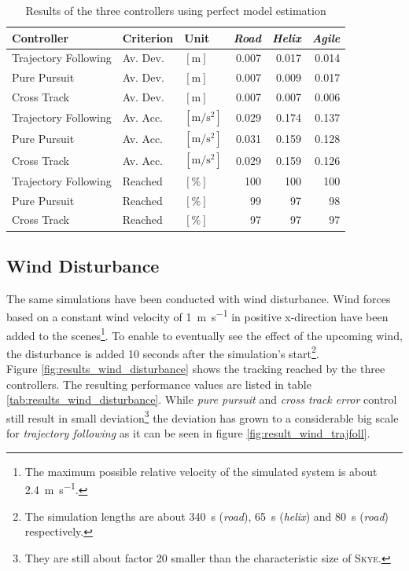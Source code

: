 \begin{table}[h]
\begin{center}
 \begin{tabular}{lll|rrr}
 \hline
 Controller & Criterion & Unit & \textit{Road} & \textit{Helix} & \textit{Agile} \\ \hline \hline
 Trajectory Following & Av. Dev. & $[\si{\meter}]$ & 0.007 & 0.017 & 0.014 \\
 Pure Pursuit         & Av. Dev. & $[\si{\meter}]$ & 0.007 & 0.009 & 0.017 \\
 Cross Track          & Av. Dev. & $[\si{\meter}]$ &  0.007 & 0.007 & 0.006 \\
    
 Trajectory Following & Av. Acc. & $[\si{\meter\per\square\second}]$ & 0.029 & 0.174 & 0.137 \\
 Pure Pursuit         & Av. Acc. & $[\si{\meter\per\square\second}]$ & 0.031 & 0.159 & 0.128 \\
 Cross Track          & Av. Acc. & $[\si{\meter\per\square\second}]$ & 0.029 & 0.159 & 0.126 \\
 
 Trajectory Following & Reached & $[\si{\percent}]$ & 100 & 100 & 100 \\
 Pure Pursuit         & Reached & $[\si{\percent}]$ &  99 &  97 &  98 \\
 Cross Track          & Reached & $[\si{\percent}]$ &  97 &  97 &  97 \\
 \hline
 \end{tabular}
 \caption{Results of the three controllers using perfect model estimation}\vspace{1ex}
 \label{tab:results_perfect_model}
\end{center}
\end{table}


\subsection{Wind Disturbance}
\label{sub:results_wind_disturbance}

The same simulations have been conducted with wind disturbance. Wind forces based on a constant wind velocity of \SI{1}{\meter\per\second} in positive x-direction have been added to the scenes\footnote{The maximum possible relative velocity of the simulated system is about \SI{2.4}{\meter\per\second}.}. To enable to eventually see the effect of the upcoming wind, the disturbance is added 10 seconds after the simulation's start\footnote{The simulation lengths are about \SI{340}{\second} (\textit{road}), \SI{65}{\second} (\textit{helix}) and \SI{80}{\second} (\textit{road}) respectively.}. \\
Figure \ref{fig:results_wind_disturbance} shows the tracking reached by the three controllers. The resulting performance values are listed in table \ref{tab:results_wind_disturbance}. While \textit{pure pursuit} and \textit{cross track error} control still result in small deviation\footnote{They are still about factor 20 smaller than the characteristic size of \textsc{Skye}.} the deviation has grown to a considerable big scale for \textit{trajectory following} as it can be seen in figure \ref{fig:result_wind_trajfoll}.

